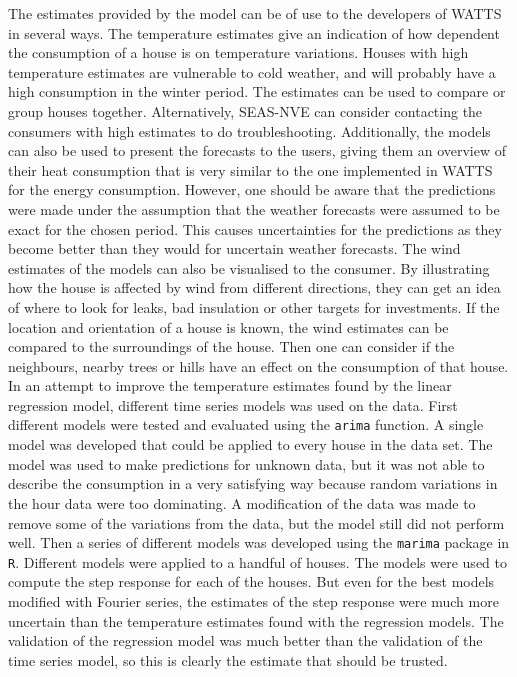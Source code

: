 \noindent The estimates provided by the model can be of use to the developers of WATTS in several ways. The temperature estimates give an indication of how dependent the consumption of a house is on temperature variations. Houses with high temperature estimates are vulnerable to cold weather, and will probably have a high consumption in the winter period. The estimates can be used to compare or group houses together. Alternatively, SEAS-NVE can consider contacting the consumers with high estimates to do troubleshooting.
Additionally, the models can also be used to present the forecasts to the users, giving them an overview of their heat consumption that is very similar to the one implemented in WATTS for the energy consumption. However, one should be aware that the predictions were made under the assumption that the weather forecasts were assumed to be exact for the chosen period. This causes uncertainties for the predictions as they become better than they would for uncertain weather forecasts. The wind estimates of the models can also be visualised to the consumer. By illustrating how the house is affected by wind from different directions, they can get an idea of where to look for leaks, bad insulation or other targets for investments. If the location and orientation of a house is known, the wind estimates can be compared to the surroundings of the house. Then one can consider if the neighbours, nearby trees or hills have an effect on the consumption of that house. \\

\noindent In an attempt to improve the temperature estimates found by the linear regression model, different time series models was used on the data. First different models were tested and evaluated using the \texttt{arima} function. A single model was developed that could be applied to every house in the data set. The model was used to make predictions for unknown data, but it was not able to describe the consumption in a very satisfying way because random variations in the hour data were too dominating. A modification of the data was made to remove some of the variations from the data, but the model still did not perform well. Then a series of different models was developed using the \texttt{marima} package in \texttt{R}. Different models were applied to a handful of houses. The models were used to compute the step response for each of the houses. But even for the best models modified with Fourier series, the estimates of the step response were much more uncertain than the temperature estimates found with the regression models. The validation of the regression model was much better than the validation of the time series model, so this is clearly the estimate that should be trusted. \\

